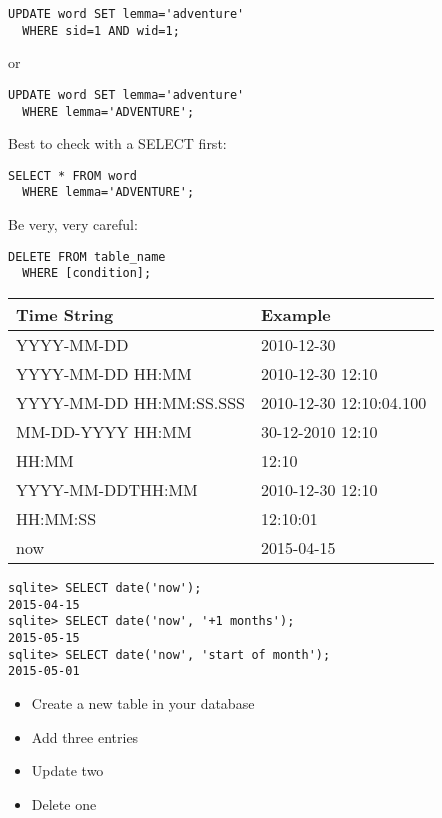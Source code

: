\documentclass[a4paper,landscape,headrule,footrule,xetex]{foils}
\begin{document}

\begin{verbatim}
UPDATE word SET lemma='adventure'
  WHERE sid=1 AND wid=1;
\end{verbatim}

or

\begin{verbatim}
UPDATE word SET lemma='adventure'
  WHERE lemma='ADVENTURE';
\end{verbatim}


Best to check with a SELECT first:
\begin{verbatim}
SELECT * FROM word 
  WHERE lemma='ADVENTURE';
\end{verbatim}


Be very, very careful:
\begin{verbatim}
DELETE FROM table_name
  WHERE [condition];
\end{verbatim}

\begin{tabular}{ll}
Time String  & Example \\ \hline
YYYY-MM-DD & 2010-12-30 \\
YYYY-MM-DD HH:MM & 2010-12-30 12:10 \\
YYYY-MM-DD HH:MM:SS.SSS & 2010-12-30 12:10:04.100 \\
MM-DD-YYYY HH:MM & 30-12-2010 12:10 \\
HH:MM & 12:10 \\
YYYY-MM-DDTHH:MM & 2010-12-30 12:10 \\
HH:MM:SS & 12:10:01 \\
now & 2015-04-15
\end{tabular}
\begin{verbatim}
sqlite> SELECT date('now');
2015-04-15
sqlite> SELECT date('now', '+1 months');
2015-05-15
sqlite> SELECT date('now', 'start of month');
2015-05-01
\end{verbatim}


\begin{itemize}
\item Create a new table in your database
\item Add three entries
\item Update two
\item Delete one
\end{itemize}
\end{document}

